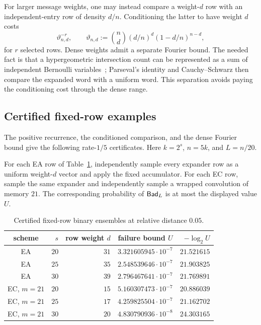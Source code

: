 For larger message weights, one may instead compare a weight-$d$ row with an
independent-entry row of density $d/n$.  Conditioning the latter to have
weight $d$ costs
\begin{equation}
 \vartheta_{n,d}^{-r},\qquad
 \vartheta_{n,d}:=\binom nd(d/n)^d(1-d/n)^{n-d},
 \label{eq:fixed-row-conditioning}
\end{equation}
for $r$ selected rows.  Dense weights admit a separate Fourier bound.  The
needed fact is that a hypergeometric intersection count can be represented as
a sum of independent Bernoulli variables~\cite{HuiPark2014}; Parseval's
identity and Cauchy--Schwarz then compare the expanded word with a uniform
word.  This separation avoids paying the conditioning cost through the dense
range.

\subsection{Certified fixed-row examples}

The positive recurrence, the conditioned comparison, and the dense Fourier
bound give the following rate-$1/5$ certificates.  Here $k=2^s$, $n=5k$, and
$L=n/20$.

\begin{theorem}
\label{thm:fixed-row-certificates}
For each EA row of Table~\ref{tab:fixed-row-certificates}, independently
sample every expander row as a uniform weight-$d$ vector and apply the fixed
accumulator.  For each EC row, sample the same expander and independently
sample a wrapped convolution of memory $21$.  The corresponding probability
of $\mathsf{Bad}_L$ is at most the displayed value $U$.
\end{theorem}

\begin{table}[tbp]
\centering
\caption{Certified fixed-row binary ensembles at relative distance $0.05$.}
\label{tab:fixed-row-certificates}
\begin{tabular}{@{}crrrr@{}}
\toprule
scheme & $s$ & row weight $d$ & failure bound $U$ & $-\log_2U$\\
\midrule
EA & $20$ & $31$ & $3.321605945\cdot10^{-7}$ & $21.521615$\\
EA & $25$ & $35$ & $2.548539646\cdot10^{-7}$ & $21.903825$\\
EA & $30$ & $39$ & $2.796467641\cdot10^{-7}$ & $21.769891$\\
EC, $m=21$ & $20$ & $15$ & $5.160307473\cdot10^{-7}$ & $20.886039$\\
EC, $m=21$ & $25$ & $17$ & $4.259825504\cdot10^{-7}$ & $21.162702$\\
EC, $m=21$ & $30$ & $20$ & $4.830790936\cdot10^{-8}$ & $24.303165$\\
\bottomrule
\end{tabular}
\end{table}

